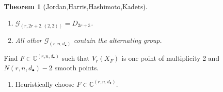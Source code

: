 \documentclass[final]{beamer}
\theoremstyle{thrm}
\newtheorem{thm}{Theorem}
\newcommand{\blue}[1]{{\color{black!15!blue}\underline{#1}}}
\newcommand{\headft}[1]{
\begin{center}
\underline{\quad{\LARGE \color{black!50!blue!50}{#1}}\quad}
\end{center}
}
\begin{document}
\begin{frame}
\begin{minipage}[t]{.3\textwidth}
\begin{thm}[Jordan,Harris,Hashimoto,Kadets]
\begin{enumerate}
\vspace{.4cm}

\item[$\bullet$] [Has,K] $\mathcal{G}_{(r,2r+2,(2,2))} = D_{2r+3}$.

\vspace{.4cm}

\item[$\bullet$] [Has,K] All other $\mathcal{G}_{(r,n,d_\bullet)}$ contain the alternating group.
\end{enumerate}
\vspace{.1cm}
\end{thm}

\vspace{0cm}







%


\headft{Finding a simple transposition}
\begin{minipage}{.65\textwidth}
Find $F\in\mathbb{C}^{(r,n,d_\bullet)}$ such that $V_r(X_F)$ is one point of multiplicity 2 and $N(r,n,d_\bullet)-2$ smooth points.
\begin{enumerate}
\item[$\bullet$] Heuristically choose $F\in\mathbb{C}^{(r,n,d_\bullet)}$.


\end{enumerate}
\end{minipage}
\end{minipage}
\end{frame}
\end{document}
